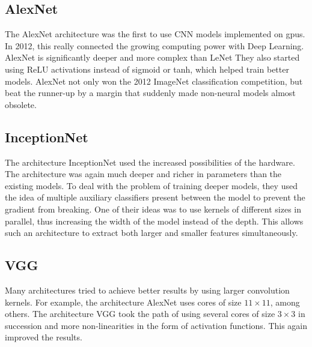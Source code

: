 {\begin{table}
\end{table}

  


\subsection{AlexNet} 

The AlexNet architecture was the first to use CNN models implemented on \ac{gpu}s.  In 2012, this really connected the growing computing power with Deep Learning. AlexNet is significantly deeper and more complex than LeNet They also started using ReLU activations instead of sigmoid or tanh, which helped train better models. AlexNet not only won the 2012 ImageNet classification competition, but beat the runner-up by a margin that suddenly made non-neural models almost obsolete. \cite{Krizhevsky:2012}



\subsection{InceptionNet}


The architecture InceptionNet used the increased possibilities of the hardware. The architecture was again much deeper and richer in parameters than the existing models. To deal with the problem of training deeper models, they used the idea of multiple auxiliary classifiers present between the model to prevent the gradient from breaking. One of their ideas was to use kernels of different sizes in parallel, thus increasing the width of the model instead of the depth. This allows such an architecture to extract both larger and smaller features simultaneously. \cite{Szegedy:2014}


\subsection{VGG}

Many architectures tried to achieve better results by using larger convolution kernels. For example, the architecture AlexNet uses cores of size $11 \times 11$, among others. The architecture VGG took the path of using several cores of size $3\times 3$ in succession and more non-linearities in the form of activation functions. This again improved the results. \cite{Zhang:2015,Simonyan:2015}

}

